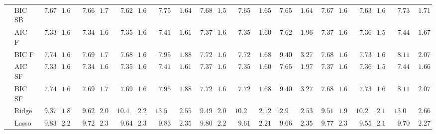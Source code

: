 \begin{tabular}{p{0.2cm}p{1cm}|p{0.6cm}p{0.6cm}|p{0.6cm}p{0.6cm}p{0.6cm}p{0.6cm}p{0.6cm}p{0.6cm}|p{0.6cm}p{0.6cm}p{0.6cm}p{0.6cm}p{0.6cm}p{0.6cm}|p{0.6cm}p{0.6cm}p{0.6cm}p{0.6cm}p{0.6cm}p{0.6cm}}
 & BIC SB  & $\phantom{0}7.67$ & $1.66$ & $\phantom{0}7.66$ & $1.70$ & $\phantom{0}7.62$ & $1.63$ & $\phantom{0}7.75$ & $\phantom{0}1.64$ & $\phantom{0}7.68$ & $1.59$ & $\phantom{0}7.65$ & $\phantom{0}1.65$ & $\phantom{0}7.65$ & $\phantom{0}1.64$ & $\phantom{0}7.67$ & $1.66$ & $\phantom{0}7.63$ & $1.64$ & $\phantom{0}7.73$ & $\phantom{0}1.71$ \\
 & AIC F  & $\phantom{0}7.33$ & $1.60$ & $\phantom{0}7.34$ & $1.61$ & $\phantom{0}7.35$ & $1.61$ & $\phantom{0}7.41$ & $\phantom{0}1.61$ & $\phantom{0}7.37$ & $1.61$ & $\phantom{0}7.35$ & $\phantom{0}1.60$ & $\phantom{0}7.62$ & $\phantom{0}1.96$ & $\phantom{0}7.37$ & $1.60$ & $\phantom{0}7.36$ & $1.58$ & $\phantom{0}7.44$ & $\phantom{0}1.67$ \\
 & BIC F  & $\phantom{0}7.74$ & $1.64$ & $\phantom{0}7.69$ & $1.72$ & $\phantom{0}7.68$ & $1.63$ & $\phantom{0}7.95$ & $\phantom{0}1.88$ & $\phantom{0}7.72$ & $1.61$ & $\phantom{0}7.72$ & $\phantom{0}1.68$ & $\phantom{0}9.40$ & $\phantom{0}3.27$ & $\phantom{0}7.68$ & $1.68$ & $\phantom{0}7.73$ & $1.64$ & $\phantom{0}8.11$ & $\phantom{0}2.07$ \\
 & AIC SF  & $\phantom{0}7.33$ & $1.60$ & $\phantom{0}7.34$ & $1.61$ & $\phantom{0}7.35$ & $1.61$ & $\phantom{0}7.41$ & $\phantom{0}1.61$ & $\phantom{0}7.37$ & $1.61$ & $\phantom{0}7.35$ & $\phantom{0}1.60$ & $\phantom{0}7.65$ & $\phantom{0}1.97$ & $\phantom{0}7.37$ & $1.60$ & $\phantom{0}7.36$ & $1.58$ & $\phantom{0}7.44$ & $\phantom{0}1.66$ \\
 & BIC SF  & $\phantom{0}7.74$ & $1.64$ & $\phantom{0}7.69$ & $1.72$ & $\phantom{0}7.69$ & $1.64$ & $\phantom{0}7.95$ & $\phantom{0}1.88$ & $\phantom{0}7.72$ & $1.61$ & $\phantom{0}7.72$ & $\phantom{0}1.68$ & $\phantom{0}9.40$ & $\phantom{0}3.27$ & $\phantom{0}7.68$ & $1.68$ & $\phantom{0}7.73$ & $1.64$ & $\phantom{0}8.11$ & $\phantom{0}2.07$ \\
 & Ridge  & $\phantom{0}9.37$ & $1.86$ & $\phantom{0}9.62$ & $2.02$ & $10.49$ & $2.24$ & $13.53$ & $\phantom{0}2.55$ & $\phantom{0}9.49$ & $2.02$ & $10.22$ & $\phantom{0}2.12$ & $12.99$ & $\phantom{0}2.53$ & $\phantom{0}9.51$ & $1.90$ & $10.24$ & $2.15$ & $13.02$ & $\phantom{0}2.66$ \\
 & Lasso  & $\phantom{0}9.83$ & $2.22$ & $\phantom{0}9.72$ & $2.35$ & $\phantom{0}9.64$ & $2.30$ & $\phantom{0}9.83$ & $\phantom{0}2.35$ & $\phantom{0}9.80$ & $2.28$ & $\phantom{0}9.61$ & $\phantom{0}2.21$ & $\phantom{0}9.66$ & $\phantom{0}2.35$ & $\phantom{0}9.77$ & $2.30$ & $\phantom{0}9.55$ & $2.18$ & $\phantom{0}9.70$ & $\phantom{0}2.27$ \\

\end{tabular}
